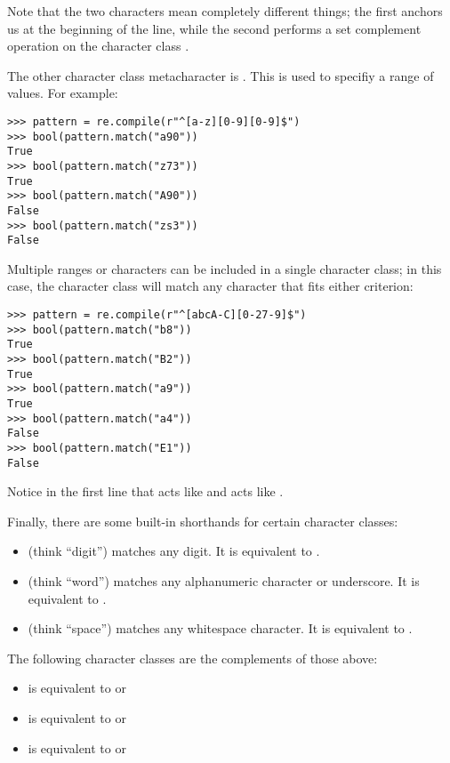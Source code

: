 Note that the two  characters mean completely different things; the first \mbox{} anchors us at the beginning of the line, while the second  performs a set complement operation on the character class .

The other character class metacharacter is . This is used to specifiy a range of values.
For example:
\begin{lstlisting}
>>> pattern = re.compile(r"^[a-z][0-9][0-9]$")
>>> bool(pattern.match("a90"))
True
>>> bool(pattern.match("z73"))
True
>>> bool(pattern.match("A90"))
False
>>> bool(pattern.match("zs3"))
False
\end{lstlisting}

Multiple ranges or characters can be included in a single character class; in this case, the character class will match any character that fits either criterion:
\begin{lstlisting}
>>> pattern = re.compile(r"^[abcA-C][0-27-9]$")
>>> bool(pattern.match("b8"))
True
>>> bool(pattern.match("B2"))
True
>>> bool(pattern.match("a9"))
True
>>> bool(pattern.match("a4"))
False
>>> bool(pattern.match("E1"))
False
\end{lstlisting}
Notice in the first line that \li{[abcA-C]} acts like \li{[a|b|c|(A-C)]} and \li{[0-27-9]} acts like \li{[(0-2)|(7-9)]}.

Finally, there are some built-in shorthands for certain character classes:
\begin{itemize}
    \item {} (think ``digit'') matches any digit. It is equivalent to .
    \item {} (think ``word'') matches any alphanumeric character or underscore. It is equivalent to .
    \item {} (think ``space'') matches any whitespace character. It is equivalent to .
\end{itemize}
The following character classes are the complements of those above:
\begin{itemize}
    \item {} is equivalent to  or 
    \item {} is equivalent to  or 
    \item {} is equivalent to  or 
\end{itemize}

